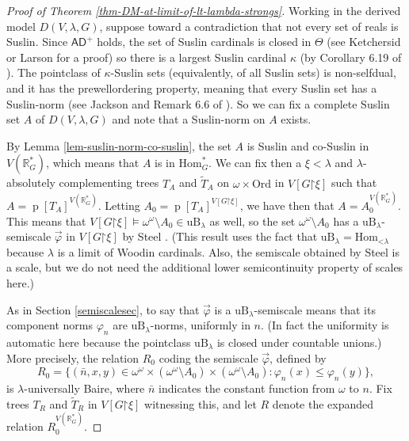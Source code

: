 \documentclass[fleqn, 11pt]{amsart}
\theoremstyle{plain}
\theoremstyle{definition}
\theoremstyle{remark}
\newcommand{\Ord}{\mathrm{Ord}}
\newcommand{\Hom}{\mathrm{Hom}}
\newcommand{\uB}{\mathrm{uB}}
\newcommand{\bbR}{\mathbb{R}}
\newcommand{\restrict}{\mathord{\restriction}}
\DeclareMathOperator{\p}{p}
\begin{document}
\begin{proof}[Proof of Theorem \ref{thm-DM-at-limit-of-lt-lambda-strongs}]
 Working in the derived model $D(V,\lambda,G)$, suppose toward a contradiction that not every set of reals is Suslin. Since $\mathsf{AD}^+$ holds, the set of Suslin cardinals is closed in $\Theta$ (see Ketchersid \cite{KetMoreAD} or Larson \cite{Larson:Extensions} for a proof) so there is a largest Suslin cardinal $\kappa$ (by Corollary 6.19 of \cite{Larson:Extensions}). The pointclass of $\kappa$-Suslin sets (equivalently, of all Suslin sets) is non-selfdual, and it has the prewellordering property, meaning that every Suslin set has a Suslin-norm (see Jackson \cite[Lemma 3.6]{JacHandbook} and Remark 6.6 of \cite{Larson:Extensions}). 
 So we can fix a complete Suslin set $A$ of $D(V,\lambda,G)$ and note that a Suslin-norm on $A$ exists.

By Lemma \ref{lem-suslin-norm-co-suslin},
the set $A$ is Suslin and co-Suslin in $V(\mathbb{R}^*_G)$, which means that $A$ is in $\Hom^*_G$. We can fix then a $\xi < \lambda$ and $\lambda$-absolutely complementing trees $T_{A}$ and $\tilde{T}_{A}$ on $\omega \times \Ord$ in $V[G \restrict \xi]$ such that $A = \p[T_{A}]^{V(\bbR^{*}_{G})}$. Letting $A_{0} = \p[T_{A}]^{V[G \restrict \xi]}$, we have then that $A = A_0^{V(\mathbb{R}^*_G)}$. 
This means that 
$V[G\restrict \xi] \models \omega^\omega \setminus A_0 \in \uB_{\lambda}$ as well, so the set $\omega^\omega \setminus A_0$ has a $\uB_{\lambda}$-semiscale $\vec{\varphi}$ in $V[G \restrict \xi]$ by Steel \cite[Theorem 5.3]{SteDMT}. (This result uses the fact that $\uB_{\lambda} = \Hom_{\mathord{<}\lambda}$ because $\lambda$ is a limit of Woodin cardinals.  Also, the semiscale obtained by Steel is a scale, but we do not need the additional lower semicontinuity property of scales here.)
 
 As in Section \ref{semiscalesec}, to say that $\vec{\varphi}$ is a $\uB_{\lambda}$-semiscale means that
 its component norms $\varphi_n$ are $\uB_{\lambda}$-norms, uniformly in $n$.  (In fact the uniformity is automatic here because the pointclass $\uB_{\lambda}$ is closed under countable unions.)
 More precisely, the relation $R_0$ coding the semiscale $\vec{\varphi}$, defined by
 \[R_0 = \big\{ (\bar{n}, x, y) \in \omega^{\omega} \times (\omega^\omega \setminus A_0) \times (\omega^\omega \setminus A_0) : \varphi_n(x) \le \varphi_n(y) \big\}, \]
 is $\lambda$-universally Baire, where $\bar{n}$ indicates the constant function from $\omega$ to $n$.
Fix trees $T_{R}$ and $\tilde{T}_{R}$ in $V[G \restrict \xi]$ witnessing this, and let $R$ denote the expanded relation $R_{0}^{V(\bbR^{*}_{G})}$. 
 

\end{proof}
\end{document}
